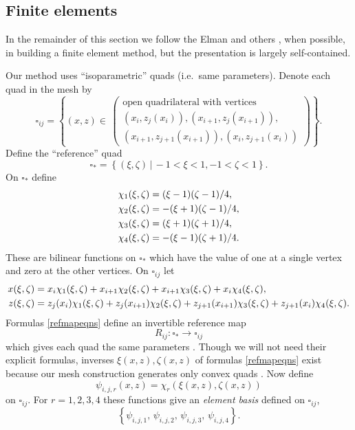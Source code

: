 \documentclass[11pt,final,reqno]{amsart}
\theoremstyle{remark}
\theoremstyle{definition}
\begin{document}
\newcommand{\quadij}{\square_{ij}}
\newcommand{\quadref}{\square_{\ast}}

\subsection*{Finite elements}  In the remainder of this section we follow the Elman and others \cite{Elmanetal2005}, when possible, in building a finite element method, but the presentation is largely self-contained.

Our method uses ``isoparametric'' quads (i.e.~same parameters).  Denote each quad in the mesh by
\begin{equation}
	  \quadij = \left\{(x,z) \in\, \begin{pmatrix}
	               \text{open quadrilateral with vertices} \\
	               (x_i,z_j(x_i)),(x_{i+1},z_j(x_{i+1})), \\
	               (x_{i+1},z_{j+1}(x_{i+1})),(x_i,z_{j+1}(x_i))
	            \end{pmatrix}\right\}. \label{quadijdefn}
\end{equation}
Define the ``reference'' quad
	$$\quadref = \left\{(\xi,\zeta) \,\Big|\, -1<\xi<1, -1<\zeta<1\right\}.$$
On $\quadref$ define \cite[equation (1.26)]{Elmanetal2005}
\begin{align}
\chi_1(\xi,\zeta) &= (\xi-1)(\zeta-1)/4, \label{chidefns} \\
\chi_2(\xi,\zeta) &= -(\xi+1)(\zeta-1)/4, \notag \\
\chi_3(\xi,\zeta) &= (\xi+1)(\zeta+1)/4, \notag \\
\chi_4(\xi,\zeta) &= -(\xi-1)(\zeta+1)/4. \notag
\end{align}
These are bilinear functions on $\quadref$ which have the value of one at a single vertex and zero at the other vertices.  On $\quadij$ let
\begin{align}
x(\xi,\zeta) &= x_i \chi_1(\xi,\zeta) + x_{i+1} \chi_2(\xi,\zeta) + x_{i+1} \chi_3(\xi,\zeta) + x_i \chi_4(\xi,\zeta), \label{refmapeqns} \\
z(\xi,\zeta) &= z_j(x_i) \chi_1(\xi,\zeta) + z_j(x_{i+1}) \chi_2(\xi,\zeta) + z_{j+1}(x_{i+1}) \chi_3(\xi,\zeta) + z_{j+1}(x_i) \chi_4(\xi,\zeta). \notag
\end{align}
Formulas \eqref{refmapeqns} define an invertible reference map
\begin{equation}
  R_{ij} : \quadref \to \quadij   \label{refmap}
\end{equation}
which gives each quad the same parameters \cite[figure 1.10]{Elmanetal2005}.  Though we will not need their explicit formulas, inverses $\xi(x,z),\zeta(x,z)$ of formulas \eqref{refmapeqns} exist because our mesh construction generates only convex quads \cite[subsection 1.4.2]{Elmanetal2005}.  Now define
\begin{equation}
	\psi_{i,j,r}(x,z) = \chi_r(\xi(x,z),\zeta(x,z))  \label{psidefn}
\end{equation}
on $\quadij$.  For $r=1,2,3,4$ these functions give an \emph{element basis} defined on $\quadij$,
	$$\left\{\psi_{i,j,1},\,\psi_{i,j,2},\,\psi_{i,j,3},\,\psi_{i,j,4}\right\}.$$
\end{document}
